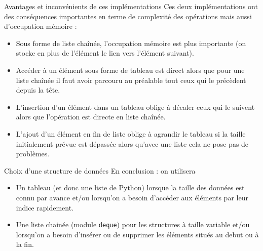\documentclass[10pt]{beamer}
\begin{document}
\begin{frame}
	\mframe{\SL}
	\begin{block}{Avantages et inconvénients de ces implémentations}
		Ces deux implémentations ont des conséquences importantes en terme de complexité des opérations mais aussi d'occupation mémoire :
		\begin{itemize}
			\item<1-> Sous forme de liste chaînée, l'occupation mémoire est plus importante (on stocke en plus de l'élément le lien vers l'élément suivant).
			\item<2-> Accéder à un élément sous forme de tableau est direct alors que pour une liste chaînée il faut avoir parcouru au préalable tout ceux qui le précèdent depuis la tête.
			\item<3-> L'insertion d'un élément dans un tableau oblige à décaler ceux qui le suivent alors que l'opération est directe en liste chaînée.
			\item<4-> L'ajout d'un élément en fin de liste oblige à agrandir le tableau si la taille initialement prévue est dépassée alors qu'avec une liste cela ne pose pas de problèmes.
		\end{itemize}
	\end{block}
\end{frame}

\begin{frame}
	\mframe{\SL}
	\begin{alertblock}{Choix d'une structure de données}
		En conclusion : on utilisera
		\begin{itemize}
			\item<2-> Un tableau (et donc une liste de Python) lorsque la taille des données est connu par avance  et/ou lorsqu'on a besoin d'accéder aux éléments par leur indice rapidement.
			\item<3-> Une liste chainée (module {\tt deque}) pour les structures à taille variable et/ou lorsqu'on a besoin d'insérer ou de supprimer les éléments situés au debut ou à la fin.
		\end{itemize}
	\end{alertblock}
\end{frame}
\end{document}
